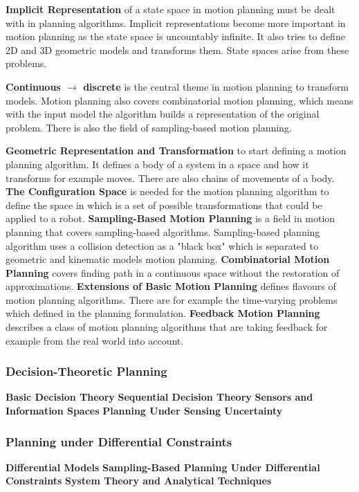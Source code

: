 \textbf{Implicit Representation} of a state space in motion planning must be dealt with in planning algorithms. Implicit representations become more important in motion planning as the state space is uncountably infinite. It also tries to define 2D and 3D geometric models and transforms them. State spaces arise from these problems.

\textbf{Continuous $\rightarrow$ discrete} is the central theme in motion planning to transform models. Motion planning also covers combinatorial motion planning, which means with the input model the algorithm builds a representation of the original problem. There is also the field of sampling-based motion planning.

\textbf{Geometric Representation and Transformation} to start defining a motion planning algorithm. It defines a body of a system in a space and how it transforms for example moves. There are also chains of movements of a body.
\textbf{The Configuration Space} is needed for the motion planning algorithm to define the space in which is a set of possible transformations that could be applied to a robot.
\textbf{Sampling-Based Motion Planning} is a field in motion planning that covers sampling-based algorithms. Sampling-based planning algorithm uses a collision detection as a "black box" which is separated to geometric and kinematic models motion planning.
\textbf{Combinatorial Motion Planning} covers finding path in a continuous space without the restoration of approximations. 
\textbf{Extensions of Basic Motion Planning} defines flavours of motion planning algorithms. There are for example the time-varying problems which defined in the planning formulation.
\textbf{Feedback Motion Planning} describes a class of motion planning algorithms that are taking feedback for example from the real world into account.

\subsubsection{Decision-Theoretic Planning}
\textbf{Basic Decision Theory}
\textbf{Sequential Decision Theory}
\textbf{Sensors and Information Spaces}
\textbf{Planning Under Sensing Uncertainty}

\subsubsection{Planning under Differential Constraints}
\textbf{Differential Models}
\textbf{Sampling-Based Planning Under Differential Constraints}
\textbf{System Theory and Analytical Techniques}

